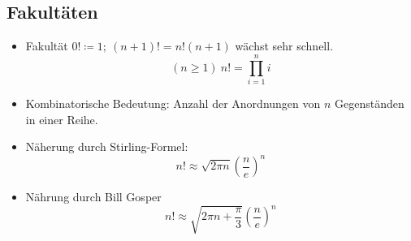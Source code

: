 \documentclass[12pt,a4paper]{article}
\begin{document}
\subsection{Fakultäten}
\begin{itemize}
	\item Fakultät $0! \coloneqq 1;\ (n+1)!=n!(n+1)$ wächst sehr schnell.
	      $$(n \geq 1)\ n! = \prod\limits_{i=1}^n i$$
	\item Kombinatorische Bedeutung: Anzahl der Anordnungen von $n$ Gegenständen in einer Reihe.
	\item Näherung durch Stirling-Formel:
	      $$n! \approx \sqrt{2 \pi n} \left(\frac{n}{e}\right)^n$$
	\item Nährung durch Bill Gosper
	      $$n! \approx \sqrt{2 \pi n + \frac{\pi}{3}}\left(\frac{n}{e}\right)^n$$
\end{itemize}
\end{document}

